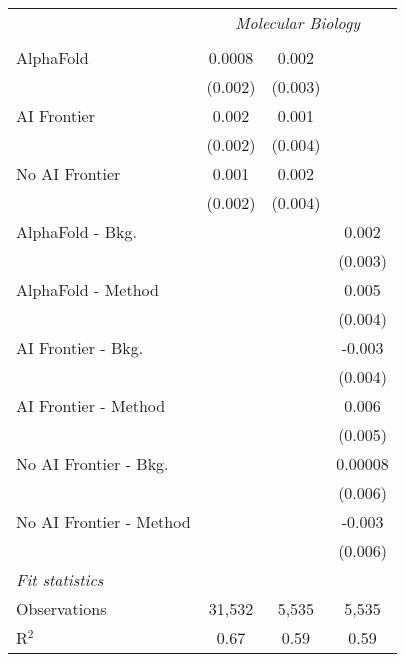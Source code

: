 \begin{tabular}{lccc}
 & \multicolumn{3}{c}{\textit{Molecular Biology}} \\ \\
   AlphaFold               & 0.0008  & 0.002   &   \\   
                           & (0.002) & (0.003) &   \\   
   AI Frontier             & 0.002   & 0.001   &   \\   
                           & (0.002) & (0.004) &   \\   
   No AI Frontier          & 0.001   & 0.002   &   \\   
                           & (0.002) & (0.004) &   \\   
   AlphaFold - Bkg.        &         &         & 0.002\\   
                           &         &         & (0.003)\\   
   AlphaFold - Method      &         &         & 0.005\\   
                           &         &         & (0.004)\\   
   AI Frontier - Bkg.      &         &         & -0.003\\   
                           &         &         & (0.004)\\   
   AI Frontier - Method    &         &         & 0.006\\   
                           &         &         & (0.005)\\   
   No AI Frontier - Bkg.   &         &         & 0.00008\\   
                           &         &         & (0.006)\\   
   No AI Frontier - Method &         &         & -0.003\\   
                           &         &         & (0.006)\\   
   \midrule
   \emph{Fit statistics}\\
   Observations            & 31,532  & 5,535   & 5,535\\  
   R$^2$                   & 0.67    & 0.59    & 0.59\\  
   

\end{tabular}
